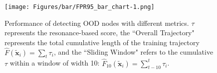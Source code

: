 

\begin{figure}[!t]
\centering
\texttt{[image: Figures/bar/FPR95\_bar\_chart-1.png]}
    \caption{Performance of detecting OOD nodes with different metrics. $\tau$ represents the resonance-based score, the ``Overall Trajectory" represents the total cumulative length of the training trajectory $\hat{F}(\tilde{\mathbf{x}}_i) = \sum_t \tau_i$, and the ``Sliding Window" refers to the cumulative $\tau$ within a window of width 10: $\hat{F}_{10}(\tilde{\mathbf{x}}_i) = \sum^t_{t-10} \tau_i$.}
    \label{F-tau-F-SW}
    \vskip -0.1in
\end{figure}

